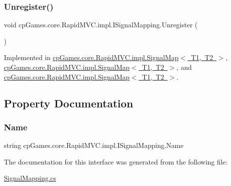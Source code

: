 \subsubsection{\texorpdfstring{Unregister()}{Unregister()}}
{\footnotesize\ttfamily void cp\+Games.\+core.\+Rapid\+M\+V\+C.\+impl.\+I\+Signal\+Mapping.\+Unregister (\begin{DoxyParamCaption}{ }\end{DoxyParamCaption})}



Implemented in \mbox{\hyperlink{classcp_games_1_1core_1_1_rapid_m_v_c_1_1impl_1_1_signal_map_a0be0f141e43e884ac1ade5e72ec2d1a0}{cp\+Games.\+core.\+Rapid\+M\+V\+C.\+impl.\+Signal\+Map$<$ T1, T2 $>$}}, \mbox{\hyperlink{classcp_games_1_1core_1_1_rapid_m_v_c_1_1impl_1_1_signal_map_a0be0f141e43e884ac1ade5e72ec2d1a0}{cp\+Games.\+core.\+Rapid\+M\+V\+C.\+impl.\+Signal\+Map$<$ T1, T2 $>$}}, and \mbox{\hyperlink{classcp_games_1_1core_1_1_rapid_m_v_c_1_1impl_1_1_signal_map_a0be0f141e43e884ac1ade5e72ec2d1a0}{cp\+Games.\+core.\+Rapid\+M\+V\+C.\+impl.\+Signal\+Map$<$ T1, T2 $>$}}.



\subsection{Property Documentation}
\mbox{\label{interfacecp_games_1_1core_1_1_rapid_m_v_c_1_1impl_1_1_i_signal_mapping_adac75cc2cc5dbba4ed7af9c52f1f7a68}} 
\subsubsection{\texorpdfstring{Name}{Name}}
{\footnotesize\ttfamily string cp\+Games.\+core.\+Rapid\+M\+V\+C.\+impl.\+I\+Signal\+Mapping.\+Name\hspace{0.3cm}{\ttfamily [get]}}



The documentation for this interface was generated from the following file\+:\begin{DoxyCompactItemize}
\item 
\mbox{\hyperlink{_signal_mapping_8cs}{Signal\+Mapping.\+cs}}\end{DoxyCompactItemize}
